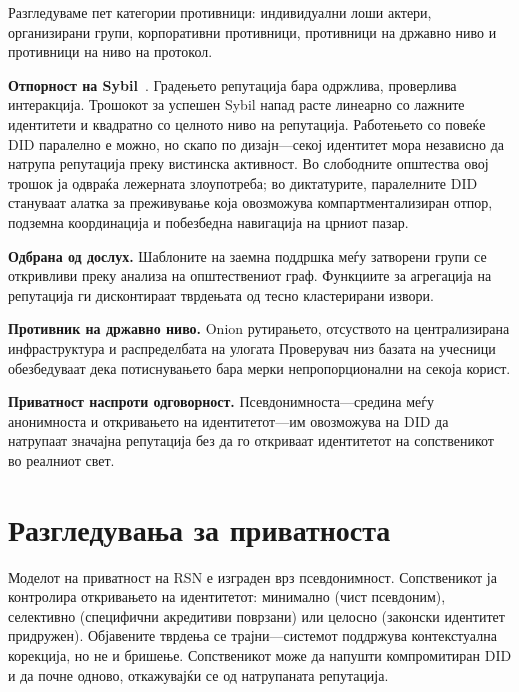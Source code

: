 \documentclass[11pt,a4paper,twocolumn]{article}
\begin{document}
Разгледуваме пет категории противници: индивидуални лоши актери, организирани групи, корпоративни противници, противници на државно ниво и противници на ниво на протокол.

\textbf{Отпорност на Sybil}~\cite{douceur2002}. Градењето репутација бара одржлива, проверлива интеракција. Трошокот за успешен Sybil напад расте линеарно со лажните идентитети и квадратно со целното ниво на репутација. Работењето со повеќе DID паралелно е можно, но скапо по дизајн---секој идентитет мора независно да натрупа репутација преку вистинска активност. Во слободните општества овој трошок ја одвраќа лежерната злоупотреба; во диктатурите, паралелните DID стануваат алатка за преживување која овозможува компартментализиран отпор, подземна координација и побезбедна навигација на црниот пазар.

\textbf{Одбрана од дослух.} Шаблоните на заемна поддршка меѓу затворени групи се откривливи преку анализа на општествениот граф. Функциите за агрегација на репутација ги дисконтираат тврдењата од тесно кластерирани извори.

\textbf{Противник на државно ниво.} Onion рутирањето, отсуството на централизирана инфраструктура и распределбата на улогата Проверувач низ базата на учесници обезбедуваат дека потиснувањето бара мерки непропорционални на секоја корист.

\textbf{Приватност наспроти одговорност.} Псевдонимноста---средина меѓу анонимноста и откривањето на идентитетот---им овозможува на DID да натрупаат значајна репутација без да го откриваат идентитетот на сопственикот во реалниот свет.

\section{Разгледувања за приватноста}

Моделот на приватност на RSN е изграден врз псевдонимност. Сопственикот ја контролира откривањето на идентитетот: минимално (чист псевдоним), селективно (специфични акредитиви поврзани) или целосно (законски идентитет придружен). Објавените тврдења се трајни---системот поддржува контекстуална корекција, но не и бришење. Сопственикот може да напушти компромитиран DID и да почне одново, откажувајќи се од натрупаната репутација.

\end{document}
